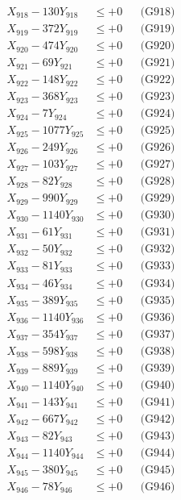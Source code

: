 \documentclass[a4paper,10pt]{article}
\begin{document}
{\begin{align}
X_{918} - 130Y_{918} &\leq +0 && \text{(G918)} \\
X_{919} - 372Y_{919} &\leq +0 && \text{(G919)} \\
X_{920} - 474Y_{920} &\leq +0 && \text{(G920)} \\
\allowbreak
X_{921} - 69Y_{921} &\leq +0 && \text{(G921)} \\
X_{922} - 148Y_{922} &\leq +0 && \text{(G922)} \\
X_{923} - 368Y_{923} &\leq +0 && \text{(G923)} \\
X_{924} - 7Y_{924} &\leq +0 && \text{(G924)} \\
X_{925} - 1077Y_{925} &\leq +0 && \text{(G925)} \\
X_{926} - 249Y_{926} &\leq +0 && \text{(G926)} \\
X_{927} - 103Y_{927} &\leq +0 && \text{(G927)} \\
X_{928} - 82Y_{928} &\leq +0 && \text{(G928)} \\
X_{929} - 990Y_{929} &\leq +0 && \text{(G929)} \\
X_{930} - 1140Y_{930} &\leq +0 && \text{(G930)} \\
\allowbreak
X_{931} - 61Y_{931} &\leq +0 && \text{(G931)} \\
X_{932} - 50Y_{932} &\leq +0 && \text{(G932)} \\
X_{933} - 81Y_{933} &\leq +0 && \text{(G933)} \\
X_{934} - 46Y_{934} &\leq +0 && \text{(G934)} \\
X_{935} - 389Y_{935} &\leq +0 && \text{(G935)} \\
X_{936} - 1140Y_{936} &\leq +0 && \text{(G936)} \\
X_{937} - 354Y_{937} &\leq +0 && \text{(G937)} \\
X_{938} - 598Y_{938} &\leq +0 && \text{(G938)} \\
X_{939} - 889Y_{939} &\leq +0 && \text{(G939)} \\
X_{940} - 1140Y_{940} &\leq +0 && \text{(G940)} \\
\allowbreak
X_{941} - 143Y_{941} &\leq +0 && \text{(G941)} \\
X_{942} - 667Y_{942} &\leq +0 && \text{(G942)} \\
X_{943} - 82Y_{943} &\leq +0 && \text{(G943)} \\
X_{944} - 1140Y_{944} &\leq +0 && \text{(G944)} \\
X_{945} - 380Y_{945} &\leq +0 && \text{(G945)} \\
X_{946} - 78Y_{946} &\leq +0 && \text{(G946)} \\

\end{align}}
\end{document}
